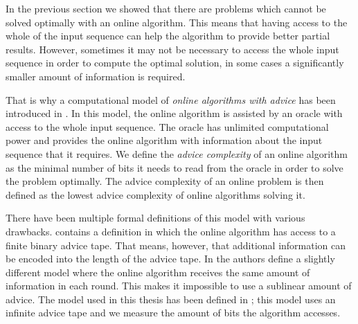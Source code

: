 In the previous section we showed that there are problems which cannot be
solved optimally with an online algorithm. This means that having access
to the whole of the input sequence can help the algorithm to provide
better partial results. However, sometimes it may not be necessary to
access the whole input sequence in order to compute the optimal solution,
in some cases a significantly smaller amount of information is required.

That is why a computational model of \emph{online algorithms with advice}
has been introduced in \cite{advice-first}. In this model, the online
algorithm is assisted by an oracle with access to the whole input
sequence. The oracle has unlimited computational power and provides the
online algorithm with information about the input sequence that it
requires. We define the \emph{advice complexity} of an online algorithm as
the minimal number of bits it needs to read from the oracle in order to
solve the problem optimally. The advice complexity of an online problem is
then defined as the lowest advice complexity of online algorithms solving
it.

There have been multiple formal definitions of this model with various
drawbacks. \cite{advice-first} contains a definition in which the online
algorithm has access to a finite binary advice tape. That means, however,
that additional information can be encoded into the length of the advice
tape. In \cite{advice-constant} the authors define a slightly different
model where the online algorithm receives the same amount of information
in each round. This makes it impossible to use a sublinear amount of
advice. The model used in this thesis has been defined in
\cite{advice-infinite}; this model uses an infinite advice tape and we
measure the amount of bits the algorithm accesses.
